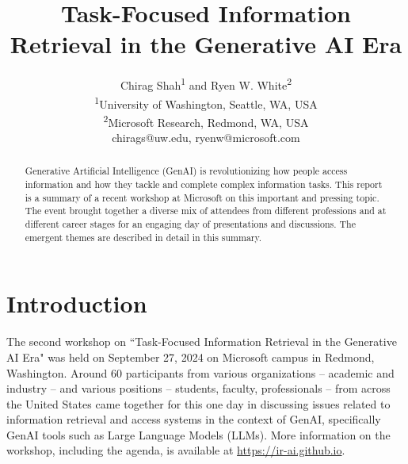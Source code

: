\documentclass[11pt,dvipdfm]{article}
\begin{document}

\title{Task-Focused Information Retrieval in the Generative AI Era}

\author{Chirag Shah\textsuperscript{1} and Ryen W. White\textsuperscript{2}\\
	\textsuperscript{1}\small{University of Washington, Seattle, WA, USA}\\
	\textsuperscript{2}\small{Microsoft Research, Redmond, WA, USA}\\
	\small{chirags@uw.edu, ryenw@microsoft.com}
}

\maketitle

\begin{abstract}
Generative Artificial Intelligence (GenAI) is revolutionizing how people access information and how they tackle and complete complex information tasks. This report is a summary of a recent workshop at Microsoft on this important and pressing topic. The event brought together a diverse mix of attendees from different professions and at different career stages for an engaging day of presentations and  discussions. The emergent themes are described in detail in this summary. 
\end{abstract}






\section{Introduction}
The second workshop on ``Task-Focused Information Retrieval in the Generative AI Era" was held on September 27, 2024 on Microsoft campus in Redmond, Washington. Around 60 participants from various organizations -- academic and industry -- and various positions -- students, faculty, professionals -- from across the United States came together for this one day in discussing issues related to information retrieval and access systems in the context of GenAI, specifically GenAI tools such as Large Language Models (LLMs). More information on the workshop, including the agenda, is available at \url{https://ir-ai.github.io}.
\end{document}
